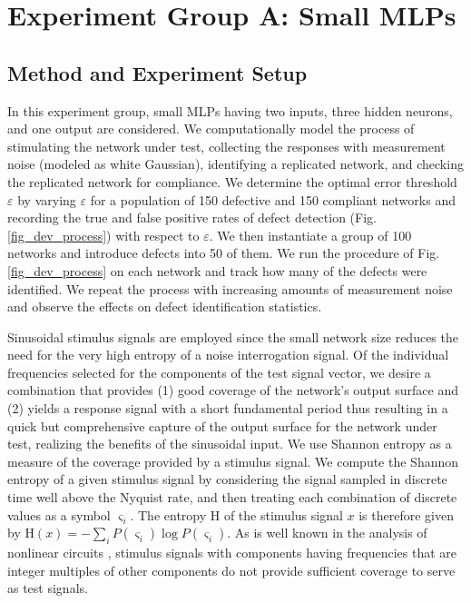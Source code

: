 \section{Experiment Group A: Small MLPs}
\label{sec_small_mlp_results}
\subsection{Method and Experiment Setup}
In this experiment group, small MLPs having two inputs, three hidden neurons, and one output
are considered.
We computationally model the process of stimulating the network under test, collecting the responses with measurement noise (modeled as white Gaussian), identifying a replicated network, and checking the replicated network for compliance.  We determine the optimal error threshold $\varepsilon$ by varying $\varepsilon$ for a population of 150 defective and 150 compliant networks and recording the true and false positive rates of defect detection (Fig. \ref{fig_dev_process}) with respect to $\varepsilon$.  We then instantiate a group of 100 networks and introduce defects into 50 of them.  We run the procedure of Fig. \ref{fig_dev_process} on each network and track how many of the defects were identified.  We repeat the process with increasing amounts of measurement noise and observe the effects on defect identification statistics.

Sinusoidal stimulus signals are employed since the small network size reduces the need for the very high entropy of a noise interrogation signal. Of the individual frequencies selected for the components of the test signal vector, we desire a combination that provides (1) good coverage of the network's output surface and (2) yields a response signal with a short fundamental period thus resulting in a quick but comprehensive capture of the output surface for the network under test, realizing the benefits of the sinusoidal input. We use Shannon entropy as a measure of the coverage provided by a stimulus signal.  We compute the Shannon entropy of a given stimulus signal by considering the signal sampled in discrete time well above the Nyquist rate, and then treating each combination of discrete values as a symbol $\varsigma_i$.  The entropy $\mathrm{H}$ of the stimulus signal $x$ is therefore given by $\mathrm{H}(x) = - \sum_i P(\varsigma_i) \log P(\varsigma_i)$.  As is well known in the analysis of nonlinear circuits \cite{wambacq_distortion_1998}, stimulus signals with components having frequencies that are integer multiples of other components do not provide sufficient coverage to serve as test signals.

